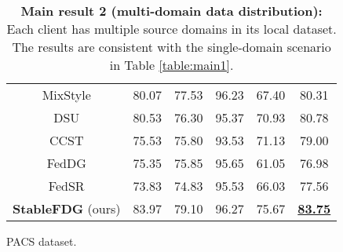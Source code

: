 \documentclass{article}
\theoremstyle{plain}
\theoremstyle{definition}
\theoremstyle{remark}
\begin{document}
\begin{table*}[!t]
\begin{subtable}[t]{1\linewidth}
\begin{tabular}{c||    cccc | c}
		MixStyle  \cite{zhou2021domain} & 80.07&	77.53&	96.23&	67.40&	80.31\\
		
		DSU  \cite{li2022uncertainty}   &  80.53&	76.30&	95.37&	70.93&	80.78\\
	CCST \cite{chen2023federated}   & 75.53	&75.80&	93.53&	71.13	&79.00\\
	    FedDG  \cite{liu2021feddg}    & 75.35	&75.85&	95.65&	61.05	&76.98 \\
FedSR  \cite{nguyen2022fedsr}     &73.83	&74.83	&95.53	&66.03&	77.56\\
	   \textbf{StableFDG}  (ours)  & 83.97	&79.10	&96.27&	75.67	&\textbf{\underline{83.75}} \\
		\bottomrule
	\end{tabular}
\caption{PACS dataset.}
\end{subtable}
\vspace{-1mm}
\caption{\textbf{Main result 2 (multi-domain data distribution):} Each client has multiple source domains in its local dataset. The results are consistent with the single-domain scenario in Table \ref{table:main1}.}
\label{table:main2}
\vspace{-4mm}
\end{table*}


 

  
\end{document}
